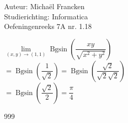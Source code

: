 \documentclass[a4paper]{article}
\newcommand{\Bgsin}{\operatorname{Bgsin}}
\begin{document}
\noindent \large Auteur: Michaël Francken \\
\noindent \large Studierichting: Informatica\\
\noindent \large Oefeningenreeks 7A nr. 1.18\\

\medskip

\normalsize

$\lim\limits_{\left(x,y\right)\rightarrow\left(1,1\right)} \Bgsin\left(\dfrac{xy}{\sqrt{x^2+y^2}}\right)$\\

$=\Bgsin\left(\dfrac{1}{\sqrt{2}}\right)=\Bgsin\left(\dfrac{\sqrt{2}}{\sqrt{2}\sqrt{2}}\right)$\\

$=\Bgsin\left(\dfrac{\sqrt{2}}{2}\right)=\dfrac{\pi}{4}$\\

\begin{thebibliography}{999}
\end{thebibliography}
\end{document}
